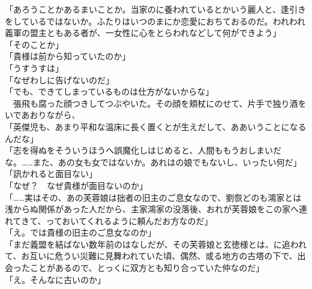 \documentclass[
  paper=a5,
  fontsize=10pt,
  jafontsize=9.5pt,
  tate,                  %
  open_bracket_pos=nibu, %
]{jlreq}
\begin{document}
「あろうことかあるまいことか。当家のに養われているとかいう麗人と、逢引きをしているではないか。ふたりはいつのまにか恋愛におちておるのだ。われわれ義軍の盟主ともある者が、一女性に心をとらわれなどして何ができよう」\\


「そのことか」\\


「貴様は前から知っていたのか」\\


「うすうすは」\\


「なぜわしに告げないのだ」\\


「でも、できてしまっているものは仕方がないからな」\\


　張飛も腐った顔つきしてつぶやいた。その顔を頬杖にのせて、片手で独り酒をいであおりながら、\\


「英傑児も、あまり平和な温床に長く置くとが生えだして、ああいうことになるんだな」\\


「志を得ぬをそういうほうへ誤魔化しはじめると、人間ももうおしまいだな。……また、あの女も女ではないか。あれはの娘でもないし、いったい何だ」\\


「訊かれると面目ない」\\


「なぜ？　なぜ貴様が面目ないのか」\\


「……実はその、あの芙蓉娘は拙者の旧主のご息女なので、劉恢どのも鴻家とは浅からぬ関係があった人だから、主家鴻家の没落後、おれが芙蓉娘をこの家へ連れてきて、っておいてくれるように頼んだお方なのだ」\\


「え。では貴様の旧主のご息女なのか」\\


「まだ義盟を結ばない数年前のはなしだが、その芙蓉娘と玄徳様とは、に追われて、お互いに危うい災難に見舞われていた頃、偶然、或る地方の古塔の下で、出会ったことがあるので、とっくに双方とも知り合っていた仲なのだ」\\


「え。そんなに古いのか」\\
\end{document}
